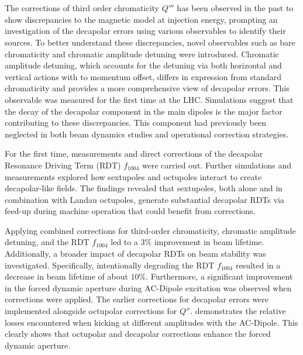 \section{}

The corrections of third order chromaticity $Q'''$ has been observed in the past to show
discrepancies to the magnetic model at injection energy, prompting an investigation of the decapolar
errors using various observables to identify their sources. To better understand these
discrepancies, novel observables such as bare chromaticity and chromatic amplitude detuning were
introduced.
%
Chromatic amplitude detuning, which accounts for the detuning via both horizontal and vertical
actions with to momentum offset, differs in expression from standard chromaticity and provides a
more comprehensive view of decapolar errors. This observable was measured for the first time at the
LHC.
%
Simulations suggest that the decay of the decapolar component in the main dipoles is the major
factor contributing to these discrepancies. This component had previously been neglected in both
beam dynamics studies and operational correction strategies.

For the first time, measurements and direct corrections of the decapolar Resonance
Driving Term (RDT) $f_{1004}$ were carried out. Further simulations and measurements explored how
sextupoles and octupoles interact to create decapolar-like fields. The findings revealed that
sextupoles, both alone and in combination with Landau octupoles, generate substantial decapolar RDTs
via feed-up during machine operation that could benefit from corrections.


Applying combined corrections for third-order chromaticity, chromatic amplitude detuning, and the
RDT $f_{1004}$ led to a $3\%$ improvement in beam lifetime. Additionally, a broader impact of
decapolar RDTs on beam stability was investigated. Specifically, intentionally degrading the RDT
$f_{1004}$ resulted in a decrease in beam lifetime of about $10\%$. 
Furthermore, a significant improvement in the forced dynamic aperture during AC-Dipole excitation
was observed when corrections were applied. The earlier corrections for decapolar errors were
implemented alongside octupolar corrections for $Q''$. 
demonstrates the relative losses encountered when kicking at different amplitudes with the
AC-Dipole. This clearly shows that octupolar and decapolar corrections enhance the forced dynamic
aperture.

